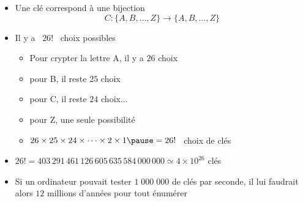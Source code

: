 \begin{frame}

\hfill\hfill{}

\begin{itemize}\setlength{\itemsep}{8pt}
  \item Une clé correspond à une bijection 
$$C : \big\{ A,B,\ldots,Z \big\}\longrightarrow \big\{ A,B,\ldots,Z \big\}$$
  \pause
  \item Il y a \  $26!$  \  choix possibles
  \begin{itemize}
    \pause
    \item Pour crypter la lettre A, il y a $26$ choix 
    \pause
    \item pour B, il reste $25$ choix
    \pause
    \item pour C, il reste $24$ choix...
    \pause
    \item pour Z, une seule possibilité
    \pause
    \item $26\times 25 \times 24 \times \cdots \times 2 \times 1 \pause = 26!$ \ choix de clés
  \end{itemize}
   
  \pause
  \item $26! =403\,291\,461\,126\,605\,635\,584\,000\,000\simeq 4 \times 10^{26}$ clés
  \pause
  \item Si un ordinateur pouvait tester $1 \; 000\; 000$ de clés par seconde, il lui faudrait alors 
$12$ millions d'années pour tout énumérer
\end{itemize}


\end{frame}



